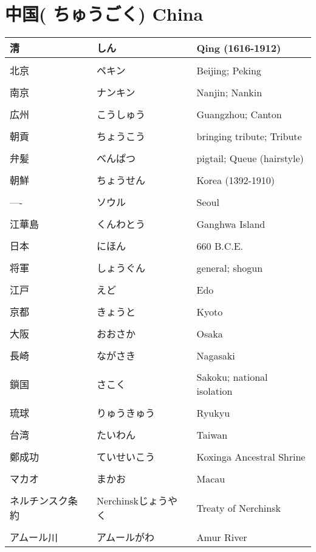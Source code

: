 \documentclass{article}
\begin{document}
\section{中国( ちゅうごく) China}
\begin{tabular}{p{4.5cm} | p{4.5cm} | p{10.5cm}}
清 & しん &Qing (1616-1912)\\ \hline \\[-1em]
北京& ペキン & Beijing; Peking\\ \hline \\[-1em]
南京 & ナンキン & Nanjin; Nankin\\ \hline \\[-1em]
広州 & こうしゅう & Guangzhou; Canton\\ \hline \\[-1em]
朝貢 & ちょうこう & bringing tribute; Tribute\\ \hline \\[-1em]
弁髪 & べんぱつ & pigtail; Queue (hairstyle)\\ \hline \\[-1em]
朝鮮&  ちょうせん & Korea (1392-1910)\\ \hline \\[-1em]
---- & ソウル & Seoul \\ \hline \\[-1em]
江華島&くんわとう&Ganghwa Island\\ \hline \\[-1em]
日本& にほん & 660 B.C.E.\\ \hline \\[-1em]
将軍 & しょうぐん &general; shogun\\ \hline \\[-1em]
江戸& えど & Edo\\ \hline \\[-1em]
京都& きょうと &Kyoto\\ \hline \\[-1em]
大阪& おおさか &Osaka\\ \hline \\[-1em]
長崎& ながさき &Nagasaki\\ \hline \\[-1em]
鎖国& さこく &Sakoku; national isolation\\ \hline \\[-1em]
琉球& りゅうきゅう &Ryukyu\\ \hline \\[-1em]
台湾& たいわん &Taiwan\\ \hline \\[-1em]
鄭成功&ていせいこう&Koxinga Ancestral Shrine\\ \hline \\[-1em]
マカオ&まかお&Macau\\ \hline \\[-1em]
ネルチンスク条約 &Nerchinskじょうやく&Treaty of Nerchinsk\\ \hline \\[-1em]
アムール川&アムールがわ&Amur River%
\end{tabular}
\end{document}
